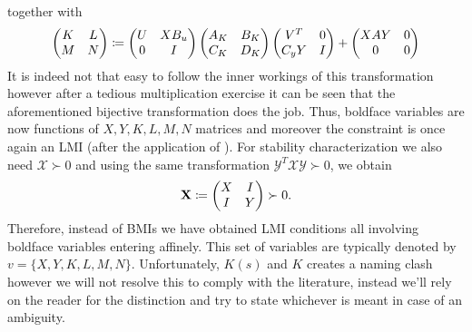 together with
\begin{equation}
\begin{pmatrix}K&L\\M&N\end{pmatrix}\coloneqq \begin{pmatrix}U&XB_u\\0&I\end{pmatrix}\begin{pmatrix}A_K  & B_K \\C_K  & D_K\end{pmatrix}
\begin{pmatrix}V^T&0\\C_yY&I\end{pmatrix}+\begin{pmatrix}XAY&0\\0&0\end{pmatrix}
\label{eq:contmatvartrafo}
\end{equation}
It is indeed not that easy to follow the inner workings of this transformation however after a tedious multiplication exercise
it can be seen that the aforementioned bijective transformation does the job. Thus, boldface variables are now functions of 
$X,Y,K,L,M,N$ matrices and moreover the constraint is once again an LMI (after the application of ). For 
stability characterization we also need $\mathcal{X}\succ 0$ and using the same transformation 
$\mathcal{Y}^T\mathcal{X}\mathcal{Y}\succ 0$, we obtain
\[
\mathbf{X} \coloneqq \begin{pmatrix}X&I\\I&Y\end{pmatrix}\succ 0.
\]
Therefore, instead of BMIs we have obtained LMI conditions all involving boldface variables entering affinely. This set of variables 
are typically denoted by $v=\{X,Y,K,L,M,N\}$. Unfortunately, $K(s)$ and $K$ creates a naming clash however we will not resolve this 
to comply with the literature, instead we'll rely on the reader for the distinction and try to state whichever is meant in case of an
ambiguity. 

